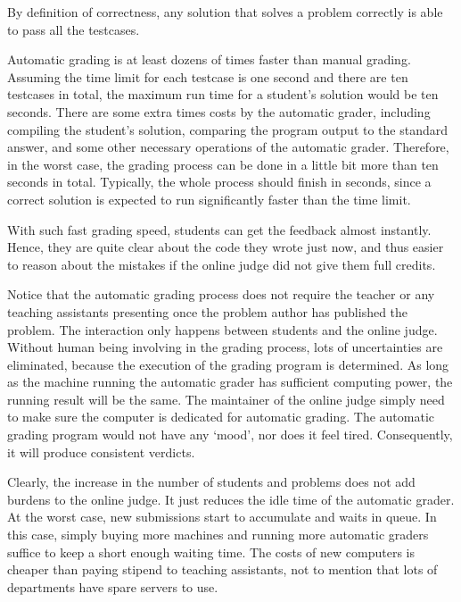             By definition of correctness, any solution that solves a problem correctly
            is able to pass all the testcases.

            Automatic grading is at least dozens of times faster than manual grading.
            Assuming the time limit for each testcase is one second and there are ten testcases in total,
            the maximum run time for a student's solution would be ten seconds.
            There are some extra times costs by the automatic grader, including
            compiling the student's solution, comparing the program output to the standard answer,
            and some other necessary operations of the automatic grader.
            Therefore, in the worst case,
            the grading process can be done in a little bit more than ten seconds in total.
            Typically, the whole process should finish in seconds,
            since a correct solution is expected to run significantly faster than the time limit.

            With such fast grading speed, students can get the feedback almost instantly.
            Hence, they are quite clear about the code they wrote just now, and thus easier to 
            reason about the mistakes if the online judge did not give them full credits.

            Notice that the automatic grading process does not require
            the teacher or any teaching assistants presenting
            once the problem author has published the problem.
            The interaction only happens between students and the online judge.
            Without human being involving in the grading process,
            lots of uncertainties are eliminated,
            because the execution of the grading program is determined.
            As long as the machine running the automatic grader has sufficient computing power,
            the running result will be the same.
            The maintainer of the online judge simply need to
            make sure the computer is dedicated for automatic grading.
            The automatic grading program would not have any `mood', nor does it feel tired.
            Consequently, it will produce consistent verdicts.

            Clearly, the increase in the number of students and problems does not add burdens to the online judge.
            It just reduces the idle time of the automatic grader.
            At the worst case, new submissions start to accumulate and waits in queue.
            In this case, simply buying more machines and running more automatic graders
            suffice to keep a short enough waiting time.
            The costs of new computers is cheaper than paying stipend to teaching assistants,
            not to mention that lots of departments have spare servers to use.

